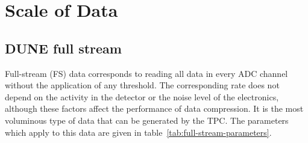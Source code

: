 \documentclass[pdftex,12pt,letter]{article}
\begin{document}
\section{Scale of Data}
\subsection{DUNE full stream}

Full-stream (FS) data corresponds to reading all data in every ADC channel without
the application of any threshold. The corresponding rate does not depend on the 
activity in the detector or the noise
level of the electronics, although these factors affect the performance of data compression.
It is the most voluminous type of data
that can be generated by the TPC. The parameters which apply to this data are given in
table~\ref{tab:full-stream-parameters}.
\end{document}
